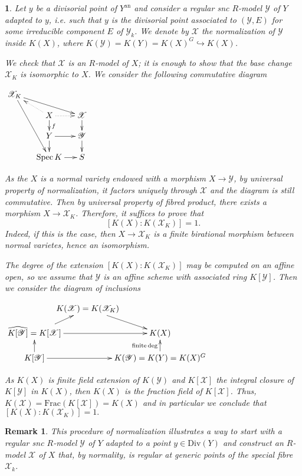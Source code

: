 \documentclass{amsart}%
\numberwithin{equation}{subsection}
\theoremstyle{plain2}
\theoremstyle{definition2}
\newtheorem{rem}[equation]{Remark}
\theoremstyle{stepstyle}
\theoremstyle{point}
\theoremstyle{subpoint}
\newtheorem{subpoint}[equation]{}%
\newcommand{\spa}[1]{\begin{subpoint}#1\end{subpoint}}           %
\newcommand{\cX}{\ensuremath{\mathscr{X}}}
\newcommand{\cY}{\ensuremath{\mathscr{Y}}}
\renewcommand{\cY}{\ensuremath{\mathscr{Y}}}
\newcommand{\Spec}{\ensuremath{\mathrm{Spec}\,}}
\newcommand{\an}{\mathrm{an}}
\begin{document}
\spa{Let $y$ be a divisorial point of $Y^\an$ and consider a regular snc $R$-model $\cY$ of $Y$ adapted to $y$, i.e. such that $y$ is the divisorial point associated to $(\cY, E)$ for some irreducible component $E$ of $\cY_k$. We denote by $\cX$ the normalization of $\cY$ inside $K(X) $, where $K(\cY)=K(Y)=K(X)^{G} \hookrightarrow K(X)$.

We check that $\cX$ is an $R$-model of $X$; it is enough to show that the base change $\cX_K$ is isomorphic to $X$. We consider the following commutative diagram
\begin{center}$
\begin{gathered}
\xymatrixrowsep{1pc}
\xymatrixcolsep{1pc}\xymatrix{ 
\cX_K \ar[drr] \ar[dddr] & & \\
& X \ar@{.>}[r] \ar@{.>}[ul]\ar[d]^{f} & \cX \ar[d] \\
& Y \ar[r] \ar[d] & \cY  \ar[d]\\
& \Spec K \ar[r] & S \\
}
\end{gathered}$
\end{center} As the $X$ is a normal variety endowed with a morphism $X \rightarrow \cY$, by universal property of normalization, it factors uniquely through $\cX$ and the diagram is still commutative. Then by universal property of fibred product, there exists a morphism $X \rightarrow \cX_K$. Therefore, it suffices to prove that $$[K(X):K(\cX_K)]=1.$$ Indeed, if this is the case, then $X \rightarrow \cX_K$ is a finite birational morphism between normal varietes, hence an isomorphism.

The degree of the extension $[K(X):K(\cX_K)]$ may be computed on an affine open, so we assume that $\cY$ is an affine scheme with associated ring $K[\cY]$. Then we consider the diagram of inclusions
\begin{center} 
$ \xymatrixcolsep{-1pc} \xymatrixrowsep{1pc}\xymatrix{ 
& K(\cX)=K(\cX_K) \ar[dr] & \\
\widehat{K[\cY]}=K[\cX] \ar[rr] \ar[ru] & & K(X)\\
K[\cY] \ar[u] \ar[rr]& & K(\cY)=K(Y)=K(X)^{G} \ar[u]^{\text{finite} \deg} \\
}$
\end{center} As $K(X)$ is finite field extension of $K(\cY)$ and $K[\cX]$ the integral closure of $K[\cY]$ in $K(X)$, then $K(X)$ is the fraction field of $K[\cX]$. Thus, $K(\cX) = \text{Frac}(K[\cX])=K(X)$ and in particular we conclude that $[K(X):K(\cX_K)]=1.$
}
\begin{rem} \label{rem divisorial repre quotient}
This procedure of normalization illustrates a way to start with a regular snc $R$-model $\cY$ of $Y$ adapted to a point $y \in \text{Div}(Y)$ and construct an $R$-model $\cX$ of $X$ that, by normality, is regular at generic points of the special fibre $\cX_k$. 
\end{rem}
\end{document}

